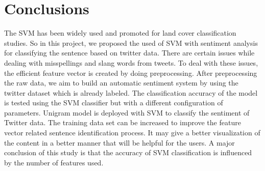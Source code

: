 \section{Conclusions}
\label{sec:concl}

The SVM has been widely used and promoted for land cover classification studies. So in this project, we proposed the used of SVM with sentiment analysis for classifying the sentence based on twitter data. There are certain issues while dealing with misspellings and slang words from tweets. To deal with these issues, the efficient feature vector is created by doing preprocessing. After preprocessing the raw data, we aim to build an automatic sentiment system by using the twitter dataset which is already labeled. The classification accuracy of the model is tested using the SVM classifier but with a different configuration of parameters. Unigram model is deployed with SVM to classify the sentiment of Twitter data. The training data set can be increased to improve the feature vector related sentence identification process. It may give a better visualization of the content in a better manner that will be helpful for the users. A major conclusion of this study is that the accuracy of SVM classification is influenced by the number of features used.


